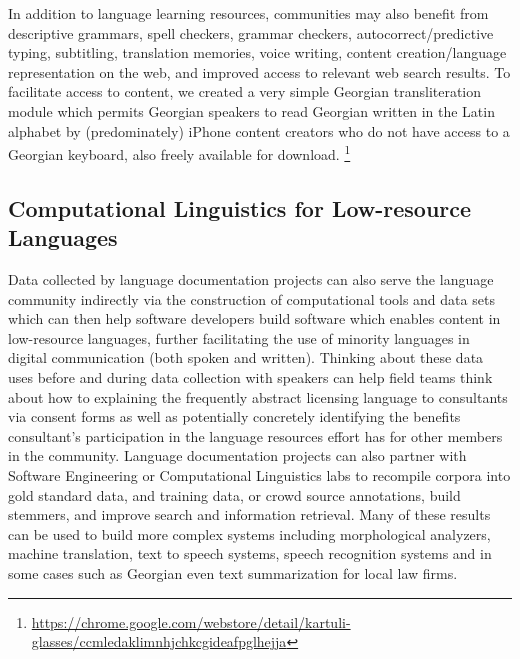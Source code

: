 \documentclass[11pt]{article}
\begin{document}
In addition to language learning resources, communities may also benefit from
descriptive grammars, spell checkers, grammar checkers, autocorrect/predictive
typing, subtitling, translation memories, voice writing, content
creation/language representation on the web, and improved access to relevant
web search results. To facilitate access to content, we created a very simple
Georgian transliteration module which permits Georgian speakers to read
Georgian written in the Latin alphabet by (predominately) iPhone content
creators who do not have access to a Georgian keyboard, also freely available
for download.%
\footnote{\url{https://chrome.google.com/webstore/detail/kartuli-glasses/ccmledaklimnhjchkcgideafpglhejja}}


\subsection{Computational Linguistics for Low-resource Languages}\label{sec:complinguistics}

Data collected by language documentation projects can also serve the language
community indirectly via the construction of computational tools and data sets
which can then help software developers build software which enables content in
low-resource languages, further facilitating the use of minority languages in
digital communication (both spoken and written). Thinking about these data uses
before and during data collection with speakers can help field teams think
about how to explaining the frequently abstract licensing language to
consultants via consent forms as well as potentially concretely identifying the
benefits  consultant's participation in the language resources effort has for
other members in the community. Language documentation projects can also
partner with Software Engineering or Computational Linguistics labs to
recompile corpora into gold standard data, and training data, or crowd source
annotations, build stemmers, and improve search and information retrieval. Many
of these results can be used to build more complex systems including
morphological analyzers, machine translation, text to speech systems, speech
recognition systems and in some cases such as Georgian even text summarization
for local law firms.
\end{document}
